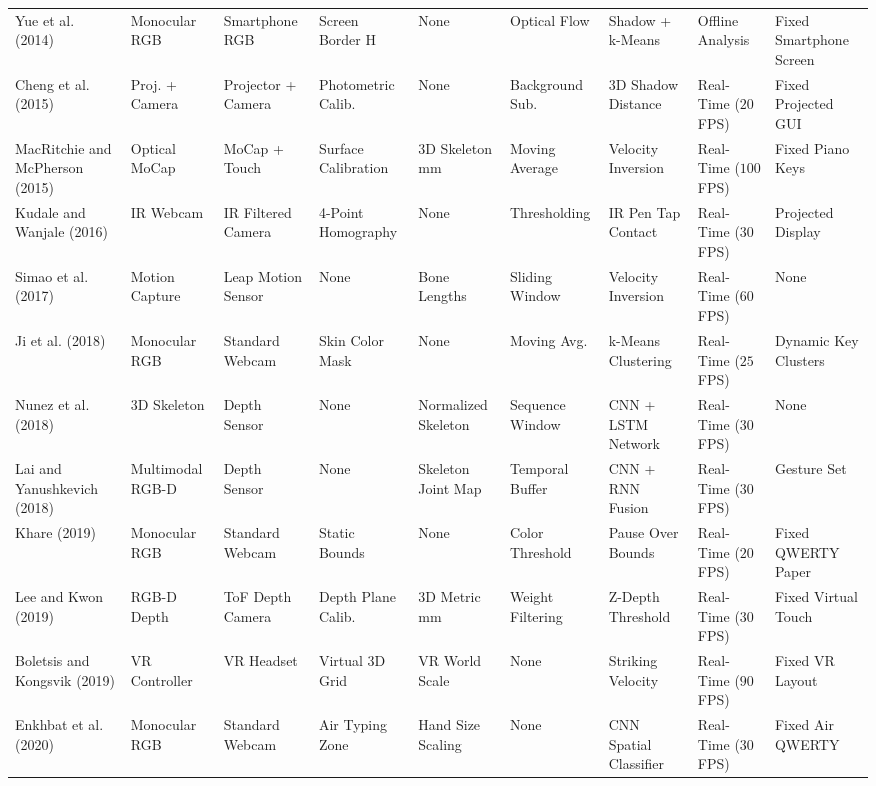 \begin{table}[htbp]
{\begin{tabular}{l l l l l l l l l}
Yue et al. (2014) \cite{Yue2014Blind} & Monocular RGB & Smartphone RGB & Screen Border H & None & Optical Flow & Shadow + k-Means & Offline Analysis & Fixed Smartphone Screen \\
Cheng et al. (2015) \cite{Cheng2015Fingertip} & Proj. + Camera & Projector + Camera & Photometric Calib. & None & Background Sub. & 3D Shadow Distance & Real-Time ($20$ FPS) & Fixed Projected GUI \\
MacRitchie and McPherson (2015) \cite{MacRitchie2015Integrating} & Optical MoCap & MoCap + Touch & Surface Calibration & 3D Skeleton mm & Moving Average & Velocity Inversion & Real-Time ($100$ FPS) & Fixed Piano Keys \\
Kudale and Wanjale (2016) \cite{Kudale2016RealTime} & IR Webcam & IR Filtered Camera & 4-Point Homography & None & Thresholding & IR Pen Tap Contact & Real-Time ($30$ FPS) & Projected Display \\
Simao et al. (2017) \cite{Simao2016Unsupervised} & Motion Capture & Leap Motion Sensor & None & Bone Lengths & Sliding Window & Velocity Inversion & Real-Time ($60$ FPS) & None \\
Ji et al. (2018) \cite{Ji2018Local} & Monocular RGB & Standard Webcam & Skin Color Mask & None & Moving Avg. & k-Means Clustering & Real-Time ($25$ FPS) & Dynamic Key Clusters \\
Nunez et al. (2018) \cite{Nunez2018Convolutional} & 3D Skeleton & Depth Sensor & None & Normalized Skeleton & Sequence Window & CNN + LSTM Network & Real-Time ($30$ FPS) & None \\
Lai and Yanushkevich (2018) \cite{Lai2018CNN} & Multimodal RGB-D & Depth Sensor & None & Skeleton Joint Map & Temporal Buffer & CNN + RNN Fusion & Real-Time ($30$ FPS) & Gesture Set \\
Khare (2019) \cite{Khare2019QWERTY} & Monocular RGB & Standard Webcam & Static Bounds & None & Color Threshold & Pause Over Bounds & Real-Time ($20$ FPS) & Fixed QWERTY Paper \\
Lee and Kwon (2019) \cite{Lee2019Virtual} & RGB-D Depth & ToF Depth Camera & Depth Plane Calib. & 3D Metric mm & Weight Filtering & Z-Depth Threshold & Real-Time ($30$ FPS) & Fixed Virtual Touch \\
Boletsis and Kongsvik (2019) \cite{Boletsis2019TextInput} & VR Controller & VR Headset & Virtual 3D Grid & VR World Scale & None & Striking Velocity & Real-Time ($90$ FPS) & Fixed VR Layout \\
Enkhbat et al. (2020) \cite{Enkhbat2020HandKey} & Monocular RGB & Standard Webcam & Air Typing Zone & Hand Size Scaling & None & CNN Spatial Classifier & Real-Time ($30$ FPS) & Fixed Air QWERTY \\

\end{tabular}}
\end{table}
